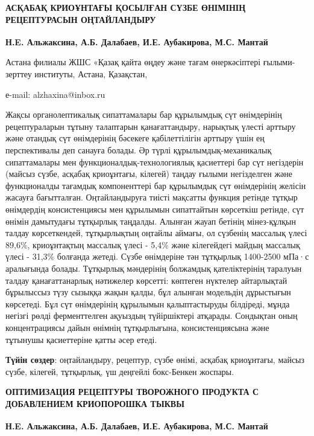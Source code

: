 \begin{articleheader}
{\bfseries АСҚАБАҚ КРИОҰНТАҒЫ ҚОСЫЛҒАН СҮЗБЕ ӨНІМІНІҢ РЕЦЕПТУРАСЫН ОҢТАЙЛАНДЫРУ}

{\bfseries
Н.E. Альжаксина\textsuperscript{\envelope },
А.Б. Далабаев,
И.Е. Аубакирова,
М.С. Мантай
}
\end{articleheader}

\begin{affiliation}
Астана филиалы ЖШС «Қазақ қайта өңдеу және тағам өнеркәсіптері ғылыми-зерттеу институты, Астана, Қазақстан,

е-mail: alzhaxina@inbox.ru
\end{affiliation}

Жақсы органолептикалық сипаттамалары бар құрылымдық сүт өнімдерінің
рецептураларын тұтыну талаптарын қанағаттандыру, нарықтық үлесті арттыру
және отандық сүт өнімдерінің бәсекеге қабілеттілігін арттыру үшін ең
перспективалы деп санауға болады. Әр түрлі құрылымдық-механикалық
сипаттамалары мен функционалдық-технологиялық қасиеттері бар сүт
негіздерін (майсыз сүзбе, асқабақ криоұнтағы, кілегей) таңдау ғылыми
негізделген және функционалды тағамдық компоненттері бар құрылымдық сүт
өнімдерінің желісін жасауға бағытталған. Оңтайландыруға тиісті мақсатты
функция ретінде тұтқыр өнімдердің консистенциясы мен құрылымын
сипаттайтын көрсеткіш ретінде, сүт өнімін дамытудағы тұтқырлық таңдалды.
Алынған жауап бетінің мінез-құлқын талдау көрсеткендей, тұтқырлықтың
оңтайлы аймағы, ол сүзбенің массалық үлесі 89,6\%, криоұнтақтың массалық
үлесі - 5,4\% және кілегейдегі майдың массалық үлесі - 31,3\% болғанда
жетеді. Сүзбе өнімдеріне тән тұтқырлық 1400-2500 мПа·с аралығында
болады. Тұтқырлық мәндерінің болжамдық қателіктерінің таралуын талдау
қанағаттанарлық нәтижелер көрсетті: көптеген нүктелер айтарлықтай
бұрылыссыз түзу сызыққа жақын қалды, бұл алынған модельдің дұрыстығын
көрсетеді. Бұл сүт өнімдерінің құрылымын қалыптастыруды білдіреді, мұнда
негізгі рөлді ферменттелген ақуыздың түйіршіктері атқарады. Сондықтан
оның концентрациясы дайын өнімнің тұтқырлығына, консистенциясына және
тұтынушы қасиеттеріне қатты әсер етеді.

{\bfseries Түйін сөздер}: оңтайландыру, рецептур, сүзбе өнімі, асқабақ
криоұнтағы, майсыз сүзбе, кілегей, тұтқырлық, үш деңгейлі бокс-Бенкен
жоспары.

\begin{articleheader}
{\bfseries ОПТИМИЗАЦИЯ РЕЦЕПТУРЫ ТВОРОЖНОГО ПРОДУКТА С ДОБАВЛЕНИЕМ КРИОПОРОШКА ТЫКВЫ}

{\bfseries
Н.E. Альжаксина\textsuperscript{\envelope },
А.Б. Далабаев,
И.Е. Аубакирова,
М.С. Мантай
}
\end{articleheader}

